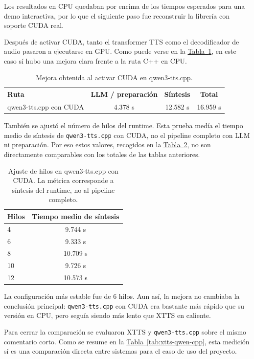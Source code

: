 Los resultados en CPU quedaban por encima de los tiempos esperados para una demo interactiva, por lo que el siguiente paso fue reconstruir la librería con soporte CUDA real.

Después de activar CUDA, tanto el transformer TTS como el decodificador de audio pasaron a ejecutarse en GPU. Como puede verse en la \hyperref[tab:qwen-cpp-cuda]{Tabla~\ref*{tab:qwen-cpp-cuda}}, en este caso sí hubo una mejora clara frente a la ruta C++ en CPU.

\begin{table}[ht]
\centering
\begin{tabular}{lccc}
\toprule
Ruta & LLM / preparación & Síntesis & Total \\
\midrule
qwen3-tts.cpp con CUDA & 4.378 s & 12.582 s & 16.959 s \\
\bottomrule
\end{tabular}
\caption{Mejora obtenida al activar CUDA en qwen3-tts.cpp.}
\label{tab:qwen-cpp-cuda}
\end{table}

También se ajustó el número de hilos del runtime. Esta prueba medía el tiempo medio de síntesis de \texttt{qwen3-tts.cpp} con CUDA, no el pipeline completo con LLM ni preparación. Por eso estos valores, recogidos en la \hyperref[tab:qwen-cpp-hilos]{Tabla~\ref*{tab:qwen-cpp-hilos}}, no son directamente comparables con los totales de las tablas anteriores.

\begin{table}[ht]
\centering
\begin{tabular}{lc}
\toprule
Hilos & Tiempo medio de síntesis \\
\midrule
4 & 9.744 s \\
6 & 9.333 s \\
8 & 10.709 s \\
10 & 9.726 s \\
12 & 10.573 s \\
\bottomrule
\end{tabular}
\caption{Ajuste de hilos en qwen3-tts.cpp con CUDA. La métrica corresponde a síntesis del runtime, no al pipeline completo.}
\label{tab:qwen-cpp-hilos}
\end{table}

La configuración más estable fue de 6 hilos. Aun así, la mejora no cambiaba la conclusión principal: \texttt{qwen3-tts.cpp} con CUDA era bastante más rápido que su versión en CPU, pero seguía siendo más lento que XTTS en caliente.

Para cerrar la comparación se evaluaron XTTS y \texttt{qwen3-tts.cpp} sobre el mismo comentario corto. Como se resume en la \hyperref[tab:xtts-qwen-cpp]{Tabla~\ref*{tab:xtts-qwen-cpp}}, esta medición sí es una comparación directa entre sistemas para el caso de uso del proyecto.

